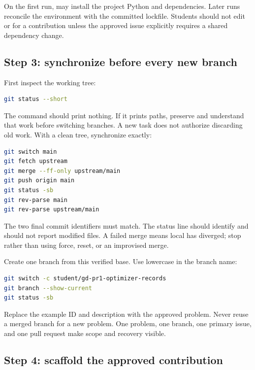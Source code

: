 On the first run,  may install the project Python and dependencies.
Later runs reconcile the environment with the committed lockfile. Students
should not edit  or  for a contribution
unless the approved issue explicitly requires a shared dependency change.

\subsection*{Step 3: synchronize  before every new branch}

First inspect the working tree:

\begin{lstlisting}[language=bash,numbers=none]
git status --short
\end{lstlisting}

The command should print nothing. If it prints paths, preserve and understand
that work before switching branches. A new task does not authorize discarding
old work. With a clean tree, synchronize exactly:

\begin{lstlisting}[language=bash,numbers=none]
git switch main
git fetch upstream
git merge --ff-only upstream/main
git push origin main
git status -sb
git rev-parse main
git rev-parse upstream/main
\end{lstlisting}

The two final commit identifiers must match. The status line should identify
 and should not report modified files. A failed 
merge means local  has diverged; stop rather than using force,
reset, or an improvised merge.

Create one branch from this verified base. Use lowercase in the branch name:

\begin{lstlisting}[language=bash,numbers=none]
git switch -c student/gd-pr1-optimizer-records
git branch --show-current
git status -sb
\end{lstlisting}

Replace the example ID and description with the approved problem. Never reuse a
merged branch for a new problem. One problem, one branch, one primary issue,
and one pull request make scope and recovery visible.

\subsection*{Step 4: scaffold the approved contribution}

